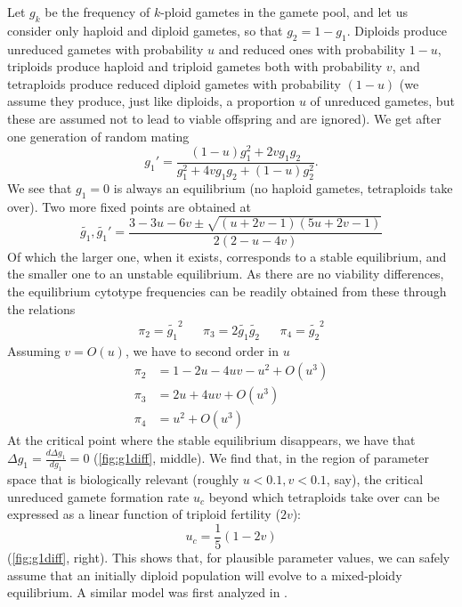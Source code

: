 \documentclass[11pt,a4paper]{article}
\begin{document}
Let $g_k$ be the frequency of $k$-ploid gametes in the gamete pool, and let us
consider only haploid and diploid gametes, so that $g_2 = 1-g_1$.
Diploids produce unreduced gametes with probability $u$ and reduced ones with
probability $1-u$, triploids produce haploid and triploid gametes both with
probability $v$, and tetraploids produce reduced diploid gametes with
probability $(1-u)$ (we assume they produce, just like diploids, a proportion
$u$ of unreduced gametes, but these are assumed not to lead to viable offspring
and are ignored).
We get after one generation of random mating
  $$g_1' = \frac{(1-u)g_1^2 + 2vg_1g_2}{g_1^2 + 4vg_1g_2 + (1-u)g_2^2}.$$
We see that $g_1=0$ is always an equilibrium (no haploid gametes, tetraploids
take over).
Two more fixed points are obtained at
  \begin{equation}
  \tilde{g_1}, \tilde{g_1}' =
    \frac{3 - 3u - 6v \pm \sqrt{(u + 2v - 1)(5u + 2v - 1)}}
         {2(2 - u - 4v)} \label{eq:gameteq}
  \end{equation}
Of which the larger one, when it exists, corresponds to a stable equilibrium,
and the smaller one to an unstable equilibrium.
As there are no viability differences, the equilibrium cytotype frequencies can
be readily obtained from these through the relations 
\begin{align}
\pi_2 = \tilde{g_1}^2 & & \pi_3 = 2\tilde{g_1}\tilde{g_2} & & 
    \pi_4 = \tilde{g_2}^2
\label{eq:cyteq}
\end{align}
Assuming $v=O(u)$, we have to second order in $u$
\begin{align}
 \pi_2 &= 1 - 2u - 4uv - u^2 + O(u^3)  \nonumber \\
 \pi_3 &= 2u + 4uv + O(u^3) \nonumber \\
 \pi_4 &= u^2 + O(u^3) 
\end{align}
At the critical point where the stable equilibrium disappears, we have that
$\Delta g_1 = \frac{d\Delta g_1}{d g_1} = 0$ (\cref{fig:g1diff}, middle).
We find that, in the region of parameter space that is biologically relevant
(roughly $u < 0.1, v < 0.1$, say), the critical unreduced gamete formation rate
$u_c$ beyond which tetraploids take over can be expressed as a linear function
of triploid fertility ($2v$):
  $$u_c = \frac{1}{5}(1-2v)$$
(\cref{fig:g1diff}, right).
This shows that, for plausible parameter values, we can safely assume that an
initially diploid population will evolve to a mixed-ploidy equilibrium.
A similar model was first analyzed in \cite{felber1997}.
\end{document}
